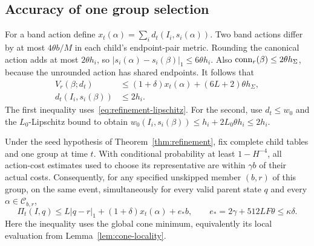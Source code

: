 \subsection{Accuracy of one group selection}

For a band action define
$x_t(\alpha)=\sum_i d_t(I_i,s_i(\alpha))$.
Two band actions differ by at most $4\theta b/M$ in each child's
endpoint-pair metric.  Rounding the canonical action adds at most
$2\theta h_i$, so
$|s_i(\alpha)-s_i(\beta)|_1\le6\theta h_i$.
Also $\operatorname{conn}_r(\beta)\le2\theta h_\Sigma$, because the unrounded
action has shared endpoints.  It follows that
\begin{equation}\label{eq:rounded-action}
 \begin{split}
 V_r(\beta;d_t)&\le(1+\delta)x_t(\alpha)
                    +(6L+2)\theta h_\Sigma,\\
 d_t(I_i,s_i(\beta))&\le2h_i.
 \end{split}
\end{equation}
The first inequality uses~\eqref{eq:refinement-lipschitz}.  For the
second, use $d_t\le w_0$ and the $L_0$-Lipschitz bound to obtain
$w_0(I_i,s_i(\beta))\le h_i+2L_0\theta h_i\le2h_i$.

\begin{lemma}\label{lem:group-accuracy}
Under the seed hypothesis of Theorem~\ref{thm:refinement}, fix complete
child tables and one group at time $t$.  With conditional
probability at least $1-H^{-4}$, all action-cost estimates used to choose
its representative are within $\gamma b$ of their actual costs.
Consequently, for any specified unskipped member $(b,r)$ of this
group, on the same event, simultaneously for every valid parent state
$q$ and every $\alpha\in\mathcal C_{b,r}$,
\begin{equation}\label{eq:group-accuracy}
 \Pi_t(I,q)\le L|q-r|_1+(1+\delta)x_t(\alpha)+e_*b,
 \qquad e_*=2\gamma+512LF\theta\le\kappa\delta.
\end{equation}
Here the inequality uses the global cone minimum, equivalently its
local evaluation from Lemma~\ref{lem:cone-locality}.
\end{lemma}

